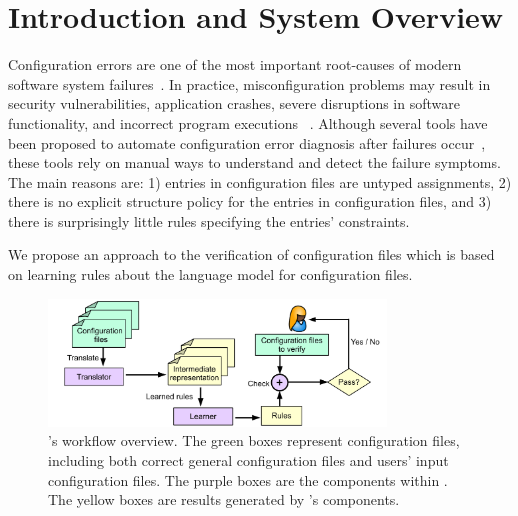 \section{Introduction and System Overview}
\label{sec:Intro}

Configuration errors are one of the most important root-causes of
modern software system failures~\cite{xu15systems,yin11anempirical}.
In practice, misconfiguration problems may result in security
vulnerabilities, application crashes, severe disruptions in software
functionality, and incorrect program executions%
~\cite{xu15systems,zhang14encore,yuan11context}.  Although several
tools have been proposed to automate configuration error diagnosis
after failures occur~\cite{wang04automatic,attariyan10automating,
su07autobash,whitaker04configuration}, these tools rely on manual ways
  to understand and detect the failure symptoms. The main reasons are:
  1) entries in configuration files are untyped assignments, 2) there
  is no explicit structure policy for the entries in configuration
  files, and 3) there is surprisingly little rules specifying the
  entries' constraints.

We propose an approach to the verification of  
configuration files which is based on learning rules about the language 
model for configuration files. 

\begin{figure}[t] \centering
\includegraphics[width=0.8\textwidth]{figs/overview}
\caption{\app's workflow overview. The green boxes represent configuration files,
  including both correct general configuration files and users' input
  configuration files. The purple boxes are the components within \app.
  The yellow boxes are results generated by \app's components.}
\label{fig-overview}
\end{figure}

